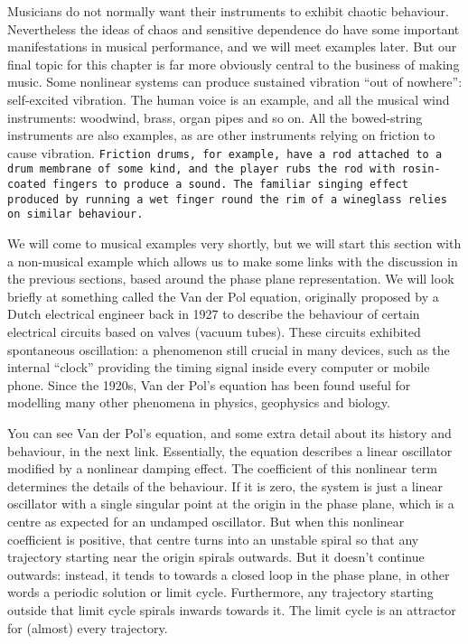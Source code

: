 

  Musicians do not normally want their instruments to exhibit chaotic 
  behaviour. Nevertheless the ideas of chaos and sensitive dependence do have 
  some important manifestations in musical performance, and we will meet 
  examples later. But our final topic for this chapter is far more obviously 
  central to the business of making music. Some nonlinear systems can produce 
  sustained vibration “out of nowhere”: self-excited vibration. The human voice 
  is an example, and all the musical wind instruments: woodwind, brass, organ 
  pipes and so on. All the bowed-string instruments are also examples, as are 
  other instruments relying on friction to cause vibration. \tt{}Friction 
  drums\rm{}, for example, have a rod attached to a drum membrane of some kind, 
  and the player rubs the rod with rosin-coated fingers to produce a sound. The 
  familiar singing effect produced by running a wet finger round the rim of a 
  wineglass relies on similar behaviour. 

  We will come to musical examples very shortly, but we will start this section 
  with a non-musical example which allows us to make some links with the 
  discussion in the previous sections, based around the phase plane 
  representation. We will look briefly at something called the Van der Pol 
  equation, originally proposed by a Dutch electrical engineer back in 1927 to 
  describe the behaviour of certain electrical circuits based on valves (vacuum 
  tubes). These circuits exhibited spontaneous oscillation: a phenomenon still 
  crucial in many devices, such as the internal ``clock'' providing the timing 
  signal inside every computer or mobile phone. Since the 1920s, Van der Pol’s 
  equation has been found useful for modelling many other phenomena in physics, 
  geophysics and biology. 

  You can see Van der Pol's equation, and some extra detail about its history 
  and behaviour, in the next link. Essentially, the equation describes a linear 
  oscillator modified by a nonlinear damping effect. The coefficient of this 
  nonlinear term determines the details of the behaviour. If it is zero, the 
  system is just a linear oscillator with a single singular point at the origin 
  in the phase plane, which is a centre as expected for an undamped oscillator. 
  But when this nonlinear coefficient is positive, that centre turns into an 
  unstable spiral so that any trajectory starting near the origin spirals 
  outwards. But it doesn't continue outwards: instead, it tends to towards a 
  closed loop in the phase plane, in other words a periodic solution or limit 
  cycle. Furthermore, any trajectory starting outside that limit cycle spirals 
  inwards towards it. The limit cycle is an attractor for (almost) every 
  trajectory. 


